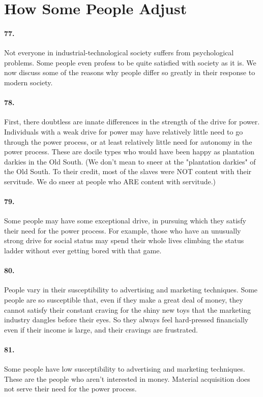 \documentclass[12pt]{book}
\newcommand{\mysection}[1]{\section*{#1} \addcontentsline{toc}{section}{#1}}
\begin{document}
\mysection{How Some People Adjust}


\paragraph{77.} Not everyone in industrial-technological society suffers from psychological problems. Some people even profess to be quite satisfied with society as it is. We now discuss some of the reasons why people differ so greatly in their response to modern society.


\paragraph{78.} First, there doubtless are innate differences in the strength of the drive for power. Individuals with a weak drive for power may have relatively little need to go through the power process, or at least relatively little need for autonomy in the power process. These are docile types who would have been happy as plantation darkies in the Old South. (We don't mean to sneer at the "plantation darkies" of the Old South. To their credit, most of the slaves were NOT content with their servitude. We do sneer at people who ARE content with servitude.)


\paragraph{79.}  Some people may have some exceptional drive, in pursuing which they satisfy their need for the power process. For example, those who have an unusually strong drive for social status may spend their whole lives climbing the status ladder without ever getting bored with that game.


\paragraph{80.} People vary in their susceptibility to advertising and marketing techniques. Some people are so susceptible that, even if they make a great deal of money, they cannot satisfy their constant craving for the shiny new toys that the marketing industry dangles before their eyes. So they always feel hard-pressed financially even if their income is large, and their cravings are frustrated.


\paragraph{81.}  Some people have low susceptibility to advertising and marketing techniques. These are the people who aren't interested in money. Material acquisition does not serve their need for the power process.
\end{document}
